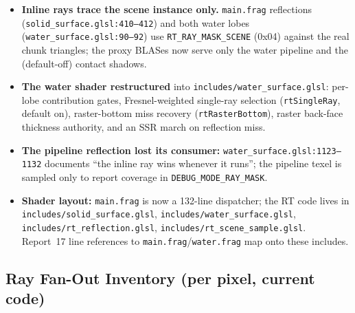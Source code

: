 \documentclass[11pt,a4paper]{article}
\begin{document}
\begin{itemize}
    \item \textbf{Inline rays trace the scene instance only.} \texttt{main.frag} reflections (\texttt{solid\_surface.glsl:410--412}) and both water lobes (\texttt{water\_surface.glsl:90--92}) use \texttt{RT\_RAY\_MASK\_SCENE} (0x04) against the real chunk triangles; the proxy BLASes now serve only the water pipeline and the (default-off) contact shadows.
    \item \textbf{The water shader restructured} into \texttt{includes/water\_surface.glsl}: per-lobe contribution gates, Fresnel-weighted single-ray selection (\texttt{rtSingleRay}, default on), raster-bottom miss recovery (\texttt{rtRasterBottom}), raster back-face thickness authority, and an SSR march on reflection miss.
    \item \textbf{The pipeline reflection lost its consumer:} \texttt{water\_surface.glsl:1123--1132} documents ``the inline ray wins whenever it runs''; the pipeline texel is sampled only to report coverage in \texttt{DEBUG\_MODE\_RAY\_MASK}.
    \item \textbf{Shader layout:} \texttt{main.frag} is now a 132-line dispatcher; the RT code lives in \texttt{includes/solid\_surface.glsl}, \texttt{includes/water\_surface.glsl}, \texttt{includes/rt\_reflection.glsl}, \texttt{includes/rt\_scene\_sample.glsl}. Report~17 line references to \texttt{main.frag}/\texttt{water.frag} map onto these includes.
\end{itemize}

\subsection{Ray Fan-Out Inventory (per pixel, current code)}
\end{document}
